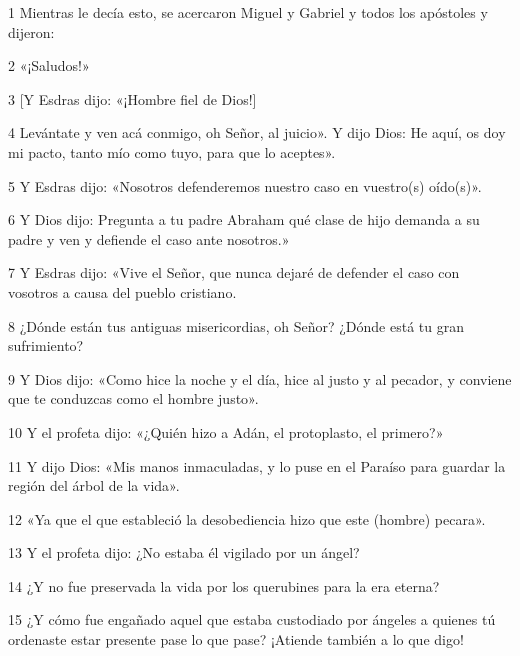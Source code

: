\par 1 Mientras le decía esto, se acercaron Miguel y Gabriel y todos los apóstoles y dijeron:

\par 2 «¡Saludos!» 

\par 3 [Y Esdras dijo: «¡Hombre fiel de Dios!] 

\par 4 Levántate y ven acá conmigo, oh Señor, al juicio». Y dijo Dios: He aquí, os doy mi pacto, tanto mío como tuyo, para que lo aceptes».

\par 5 Y Esdras dijo: «Nosotros defenderemos nuestro caso en vuestro(s) oído(s)».

\par 6 Y Dios dijo: Pregunta a tu padre Abraham qué clase de hijo demanda a su padre y ven y defiende el caso ante nosotros.»

\par 7 Y Esdras dijo: «Vive el Señor, que nunca dejaré de defender el caso con vosotros a causa del pueblo cristiano.

\par 8 ¿Dónde están tus antiguas misericordias, oh Señor? ¿Dónde está tu gran sufrimiento?

\par 9 Y Dios dijo: «Como hice la noche y el día, hice al justo y al pecador, y conviene que te conduzcas como el hombre justo».

\par 10 Y el profeta dijo: «¿Quién hizo a Adán, el protoplasto, el primero?»

\par 11 Y dijo Dios: «Mis manos inmaculadas, y lo puse en el Paraíso para guardar la región del árbol de la vida».

\par 12 «Ya que el que estableció la desobediencia hizo que este (hombre) pecara».

\par 13 Y el profeta dijo: ¿No estaba él vigilado por un ángel?

\par 14 ¿Y no fue preservada la vida por los querubines para la era eterna?

\par 15 ¿Y cómo fue engañado aquel que estaba custodiado por ángeles a quienes tú ordenaste estar presente pase lo que pase? ¡Atiende también a lo que digo!

